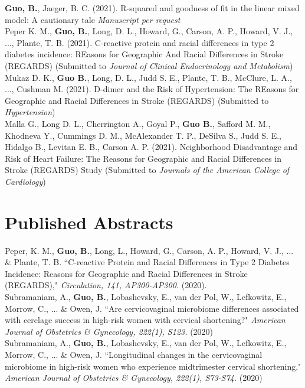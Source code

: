 \textbf{Guo, B.}, Jaeger, B. C. (2021). R-squared and goodness of fit in the linear mixed model: A cautionary tale {\it Manuscript per request}\\

Peper K. M., \textbf{Guo, B.}, Long, D. L., Howard, G., Carson, A. P., Howard, V. J., ..., Plante, T. B. (2021). C-reactive protein and racial differences in type 2 diabetes incidence: REasons for Geographic And Racial Differences in Stroke (REGARDS) (Submitted to \textit{Journal of Clinical Endocrinology and Metabolism})\\

Mukaz D. K., \textbf{Guo B.}, Long, D. L., Judd S. E., Plante, T. B., McClure, L. A., ...,  Cushman M. (2021). D-dimer and the Risk of Hypertension: The REasons for Geographic and Racial Differences in Stroke (REGARDS) (Submitted to \textit{Hypertension})\\

Malla G., Long D. L., Cherrington A., Goyal P., \textbf{Guo B.}, Safford M. M., Khodneva Y., Cummings D. M., McAlexander T. P., DeSilva S., Judd S. E., Hidalgo B., Levitan E. B., Carson A. P. (2021). Neighborhood Disadvantage and Risk of Heart Failure: The Reasons for Geographic and Racial Differences in Stroke (REGARDS) Study (Submitted to \textit{Journals of the American College of Cardiology})

\section{Published Abstracts}
Peper, K. M., \textbf{Guo, B.}, Long, L., Howard, G., Carson, A. P., Howard, V. J., ... \& Plante, T. B.  ``C-reactive Protein and Racial Differences in Type 2 Diabetes Incidence: Reasons for Geographic and Racial Differences in Stroke (REGARDS)," \textit{Circulation, 141, AP300-AP300.} (2020).\\

Subramaniam, A., \textbf{Guo, B.}, Lobashevsky, E., van der Pol, W., Lefkowitz, E., Morrow, C., ... \& Owen, J.  ``Are cervicovaginal microbiome differences associated with cerclage success in high-risk women with cervical shortening?" \textit{American Journal of Obstetrics \& Gynecology, 222(1), S123.} (2020)\\

Subramaniam, A., \textbf{Guo, B.}, Lobashevsky, E., van der Pol, W., Lefkowitz, E., Morrow, C., ... \& Owen, J.  ``Longitudinal changes in the cervicovaginal microbiome in high-risk women who experience midtrimester cervical shortening," \textit{American Journal of Obstetrics \& Gynecology, 222(1), S73-S74.} (2020)\\

